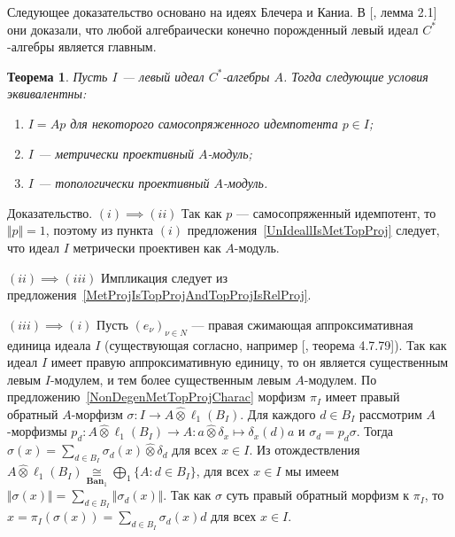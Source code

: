 \documentclass[12pt]{article}
\numberwithin{equation}{subsection}
\theoremstyle{plain}
\newtheorem{theorem}{Теорема}
\newenvironment{proof}{Доказательство.}{}
\newcommand{\projtens}{\mathbin{\widehat{\otimes}}}
\newcommand{\isom}[1]{\mathop{\mathbin{\cong}}\limits_{#1}}
\begin{document}
\begin{fulltext}
Следующее доказательство основано на идеях Блечера и Каниа. В
[\cite{BleKanFinGenCStarAlgHilbMod}, лемма 2.1] они доказали, что любой
алгебраически конечно порожденный левый идеал $C^*$-алгебры является главным.  

\begin{theorem}\label{LeftIdealOfCStarAlgMetTopProjCharac} Пусть $I$ --- левый
идеал $C^*$-алгебры $A$. Тогда следующие условия эквивалентны:
\begin{enumerate}[label = (\roman*)]
    \item $I=Ap$ для некоторого самосопряженного идемпотента $p\in I$;

    \item $I$ --- метрически проективный $A$-модуль;

    \item $I$ --- топологически проективный $A$-модуль.
\end{enumerate}
\end{theorem}
\begin{proof} $(i) \implies (ii)$ Так как $p$ --- самосопряженный идемпотент,
то $\Vert p\Vert=1$, поэтому из пункта $(i)$ 
предложения~\ref{UnIdeallIsMetTopProj} следует, 
что идеал $I$ метрически проективен как $A$-модуль.

$(ii) \implies (iii)$ Импликация следует из 
предложения~\ref{MetProjIsTopProjAndTopProjIsRelProj}.

$(iii) \implies (i)$ Пусть ${(e_\nu)}_{\nu\in N}$ --- правая сжимающая
аппроксимативная единица идеала $I$ (существующая согласно, например
[\cite{HelBanLocConvAlg}, теорема 4.7.79]). Так как идеал $I$ имеет правую
аппроксимативную единицу, то он является существенным левым $I$-модулем, и тем
более существенным левым $A$-модулем. 
По предложению~\ref{NonDegenMetTopProjCharac} морфизм 
$\pi_I$ имеет правый обратный $A$-морфизм
$\sigma:I\to A\projtens \ell_1(B_I)$. Для каждого $d\in B_I$ рассмотрим
$A$-морфизмы $p_d:A\projtens \ell_1(B_I)\to A:a\projtens \delta_x\mapsto
\delta_x(d)a$ и $\sigma_d=p_d\sigma$. Тогда $\sigma(x)=\sum_{d\in
B_I}\sigma_d(x)\projtens \delta_d$ для всех $x\in I$. Из отождествления
$A\projtens\ell_1(B_I)\isom{\mathbf{Ban}_1}\bigoplus_1 \{ A:d\in B_I \}$, для всех
$x\in I$ мы имеем $\Vert\sigma(x)\Vert=\sum_{d\in B_I} \Vert\sigma_d(x)\Vert$.
Так как $\sigma$ суть правый обратный морфизм к $\pi_I$, то
$x=\pi_I(\sigma(x))=\sum_{d\in B_I}\sigma_d(x)d$ для всех $x\in I$. 


\end{proof}
\end{fulltext}
\end{document}
